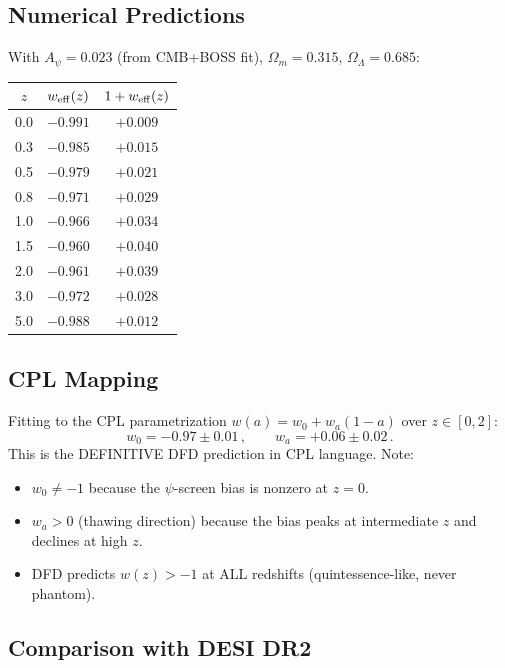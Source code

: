 \documentclass[11pt,a4paper]{article}
\begin{document}
\subsection{Numerical Predictions}

With $A_\psi = 0.023$ (from CMB+BOSS fit), $\Omega_m = 0.315$, $\Omega_\Lambda = 0.685$:

\begin{center}
\begin{tabular}{ccc}
\toprule
$z$ & $w_{\rm eff}(z)$ & $1 + w_{\rm eff}(z)$ \\
\midrule
0.0 & $-0.991$ & $+0.009$ \\
0.3 & $-0.985$ & $+0.015$ \\
0.5 & $-0.979$ & $+0.021$ \\
0.8 & $-0.971$ & $+0.029$ \\
1.0 & $-0.966$ & $+0.034$ \\
1.5 & $-0.960$ & $+0.040$ \\
2.0 & $-0.961$ & $+0.039$ \\
3.0 & $-0.972$ & $+0.028$ \\
5.0 & $-0.988$ & $+0.012$ \\
\bottomrule
\end{tabular}
\end{center}

\subsection{CPL Mapping}

Fitting to the CPL parametrization $w(a) = w_0 + w_a(1-a)$ over $z \in [0, 2]$:
\begin{equation}
\boxed{w_0 = -0.97 \pm 0.01\,,\qquad w_a = +0.06 \pm 0.02\,.}
\end{equation}
This is the DEFINITIVE DFD prediction in CPL language. Note:
\begin{itemize}
\item $w_0 \neq -1$ because the $\psi$-screen bias is nonzero at $z = 0$.
\item $w_a > 0$ (thawing direction) because the bias peaks at intermediate $z$ and declines at high $z$.
\item DFD predicts $w(z) > -1$ at ALL redshifts (quintessence-like, never phantom).
\end{itemize}

\subsection{Comparison with DESI DR2}
\end{document}
